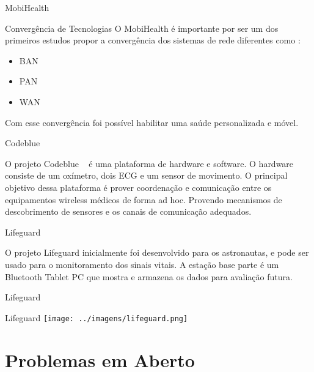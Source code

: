 \documentclass{beamer}
\begin{document}
\begin{frame}{MobiHealth}
  \begin{block}{Convergência de Tecnologias}
    O MobiHealth é importante por ser um dos primeiros estudos propor a convergência dos sistemas de rede diferentes como :
    \begin{itemize}
     \item BAN
     \item PAN 
     \item WAN 
    \end{itemize}
  \end{block}
  \begin{block}{}
   Com esse convergência foi possível habilitar uma saúde personalizada e móvel.
  \end{block}
\end{frame}


\begin{frame}{Codeblue}
  \begin{block}{}
  O projeto Codeblue ~\cite{codeblue} é uma plataforma de hardware e software. O hardware consiste de um oxímetro, dois ECG e um sensor de movimento. O principal objetivo dessa plataforma é prover coordenação e comunicação entre os equipamentos wireless médicos de forma ad hoc. Provendo mecanismos de descobrimento de sensores e os canais de comunicação adequados.
  \end{block}
\end{frame}


\begin{frame}{Lifeguard}
  \begin{block}{}
  O projeto Lifeguard inicialmente foi desenvolvido para os astronautas, e pode ser usado para o monitoramento dos sinais vitais.
  A estação base parte é um Bluetooth Tablet PC que mostra e armazena os dados para avaliação futura.
  \end{block}
\end{frame}

\begin{frame}{Lifeguard}
  \begin{block}{Lifeguard}
      \center \texttt{[image: ../imagens/lifeguard.png]}
  \end{block}
\end{frame}


\section{Problemas em Aberto}
\end{document}
